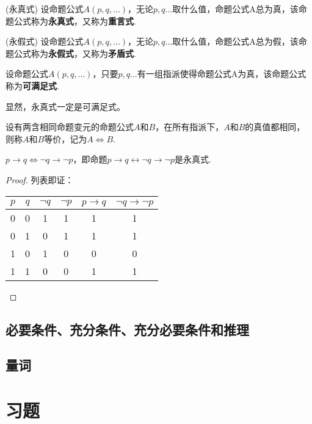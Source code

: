\begin{definition}(永真式)
    设命题公式$A(p,q,...)$，无论$p,q...$取什么值，命题公式A总为真，该命题公式称为\textbf{永真式}，又称为\textbf{重言式}.
\end{definition}
\begin{definition}(永假式)
    设命题公式$A(p,q,...)$，无论$p,q...$取什么值，命题公式A总为假，该命题公式称为\textbf{永假式}，又称为\textbf{矛盾式}.
\end{definition}
\begin{definition}
    设命题公式$A(p,q,...)$，只要$p,q...$有一组指派使得命题公式A为真，该命题公式称为\textbf{可满足式}.
\end{definition}

显然，永真式一定是可满足式。

\begin{definition}
    设有两含相同命题变元的命题公式$A$和$B$，在所有指派下，$A$和$B$的真值都相同，则称$A$和$B$等价，记为$A \Leftrightarrow B$.
\end{definition}

\begin{theorem}
    $p \to q \iff \neg q \to \neg p$，即命题$p \to q \leftrightarrow \neg q \to \neg p$是永真式.
\end{theorem}
\begin{proof}
    列表即证：

    \begin{tabular}{c|c|c|c|c|c}
        $p$ & $q$ & $\neg q$ & $\neg p$ & $p \to q$ & $\neg q \to \neg p$ \\
        \hline
        0 & 0 & 1 & 1 & 1 & 1 \\
        0 & 1 & 0 & 1 & 1 & 1 \\
        1 & 0 & 1 & 0 & 0 & 0 \\
        1 & 1 & 0 & 0 & 1 & 1
    \end{tabular}
\end{proof}

\subsection{必要条件、充分条件、充分必要条件和推理}

\subsection{量词}

\section*{习题 \thesection}

